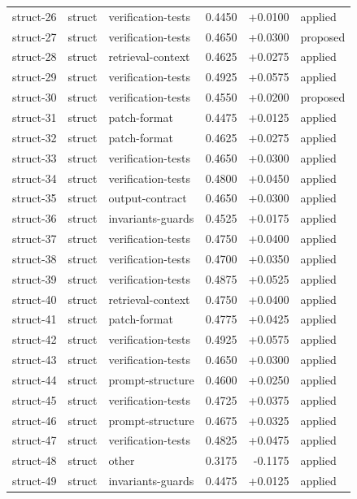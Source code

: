 \begin{center}
\begin{longtable}{llp{5.2cm}rrl}
struct-26 & struct & verification-tests & 0.4450 & +0.0100 & applied \\
struct-27 & struct & verification-tests & 0.4650 & +0.0300 & proposed \\
struct-28 & struct & retrieval-context & 0.4625 & +0.0275 & applied \\
struct-29 & struct & verification-tests & 0.4925 & +0.0575 & applied \\
struct-30 & struct & verification-tests & 0.4550 & +0.0200 & proposed \\
struct-31 & struct & patch-format & 0.4475 & +0.0125 & applied \\
struct-32 & struct & patch-format & 0.4625 & +0.0275 & applied \\
struct-33 & struct & verification-tests & 0.4650 & +0.0300 & applied \\
struct-34 & struct & verification-tests & 0.4800 & +0.0450 & applied \\
struct-35 & struct & output-contract & 0.4650 & +0.0300 & applied \\
struct-36 & struct & invariants-guards & 0.4525 & +0.0175 & applied \\
struct-37 & struct & verification-tests & 0.4750 & +0.0400 & applied \\
struct-38 & struct & verification-tests & 0.4700 & +0.0350 & applied \\
struct-39 & struct & verification-tests & 0.4875 & +0.0525 & applied \\
struct-40 & struct & retrieval-context & 0.4750 & +0.0400 & applied \\
struct-41 & struct & patch-format & 0.4775 & +0.0425 & applied \\
struct-42 & struct & verification-tests & 0.4925 & +0.0575 & applied \\
struct-43 & struct & verification-tests & 0.4650 & +0.0300 & applied \\
struct-44 & struct & prompt-structure & 0.4600 & +0.0250 & applied \\
struct-45 & struct & verification-tests & 0.4725 & +0.0375 & applied \\
struct-46 & struct & prompt-structure & 0.4675 & +0.0325 & applied \\
struct-47 & struct & verification-tests & 0.4825 & +0.0475 & applied \\
struct-48 & struct & other & 0.3175 & -0.1175 & applied \\
struct-49 & struct & invariants-guards & 0.4475 & +0.0125 & applied \\

\end{longtable}
\end{center}
